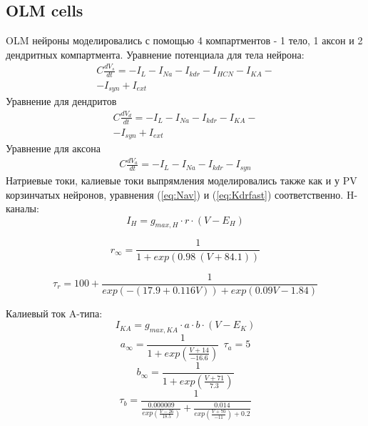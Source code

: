 \documentclass[12pt]{article}
\begin{document}
\subsection{OLM cells}
OLM нейроны моделировались с помощью 4 компартментов - 1 тело, 1 аксон и 2 дендритных компартмента. Уравнение потенциала для тела нейрона:
\begin{eqnarray}
C\frac{dV_s}{dt} = -I_L - I_{Na} - I_{kdr} - I_{HCN} - I_{KA}-
 \nonumber \\
-I_{syn} + I_{ext}
\end{eqnarray}
Уравнение для дендритов
\begin{eqnarray}
C\frac{dV_d}{dt} = -I_L - I_{Na} - I_{kdr} - I_{KA}-
\nonumber \\
-I_{syn} + I_{ext}
\end{eqnarray}
Уравнение для аксона
\begin{eqnarray}
C\frac{dV_a}{dt} = -I_L - I_{Na} - I_{kdr} - I_{syn}
\end{eqnarray}
Натриевые токи, калиевые токи выпрямления моделировались также как и у PV корзинчатых нейронов, уравнения (\ref{eq:Nav}) и (\ref{eq:Kdrfast}) соответственно.
H-каналы:
\begin{equation}
\label{eq:HCNolm}
I_{H} = g_{max, H} \cdot r \cdot (V - E_{H})
\end{equation}

\begin{equation}
r_{\infty} =  \frac{1}{1 + exp(0.98 \ (V + 84.1))}
\end{equation}

\begin{equation}
\tau_{r} = 100 + \frac{1}{exp(-(17.9+0.116V)) + exp(0.09V-1.84)   }
\end{equation}

Калиевый ток A-типа:
\begin{equation}
\label{eq:KvAolm}
I_{KA} = g_{max, KA} \cdot a \cdot b \cdot (V - E_K)
\end{equation}
\begin{equation}
a_{\infty} = \frac{1}{1 + exp(\frac{V + 14}{-16.6})  } \ \ \tau_a = 5
\end{equation}
\begin{equation}
b_{\infty} = \frac{1}{1 + exp(\frac{V + 71}{7.3})  }
\end{equation}
\begin{equation}
\tau_b = \frac{1}{\frac{0.000009}{exp(\frac{V - 26}{18.5})}  + \frac{0.014}{exp(\frac{V +70}{-11}) + 0.2} }
\end{equation}
\end{document}
